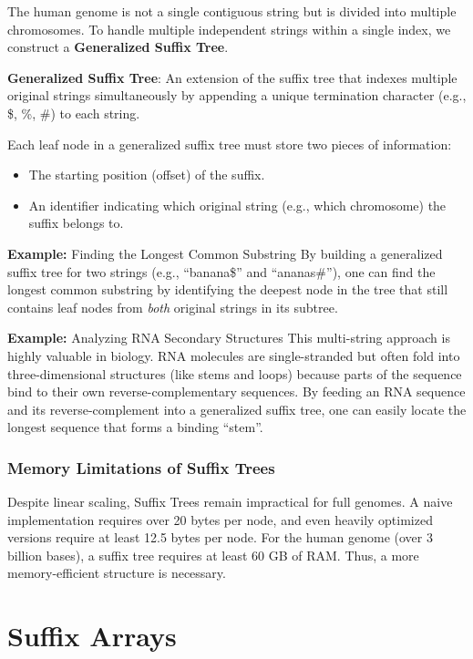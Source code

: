 The human genome is not a single contiguous string but is divided into multiple chromosomes. To handle multiple independent strings within a single index, we construct a \textbf{Generalized Suffix Tree}.

\begin{important}
  \textbf{Generalized Suffix Tree}: An extension of the suffix tree that indexes multiple original strings simultaneously by appending a unique termination character (e.g., \$, \%, \#) to each string.
\end{important}

Each leaf node in a generalized suffix tree must store two pieces of information:
\begin{itemize}
    \item The starting position (offset) of the suffix.
    \item An identifier indicating which original string (e.g., which chromosome) the suffix belongs to.
\end{itemize}

\textbf{Example:} Finding the Longest Common Substring
By building a generalized suffix tree for two strings (e.g., ``banana\$'' and ``ananas\#''), one can find the longest common substring by identifying the deepest node in the tree that still contains leaf nodes from \textit{both} original strings in its subtree. 

\textbf{Example:} Analyzing RNA Secondary Structures
This multi-string approach is highly valuable in biology. RNA molecules are single-stranded but often fold into three-dimensional structures (like stems and loops) because parts of the sequence bind to their own reverse-complementary sequences. By feeding an RNA sequence and its reverse-complement into a generalized suffix tree, one can easily locate the longest sequence that forms a binding ``stem''.

\subsubsection{Memory Limitations of Suffix Trees}
\sta Despite linear scaling, Suffix Trees remain impractical for full genomes. A naive implementation requires over 20 bytes per node, and even heavily optimized versions require at least 12.5 bytes per node. For the human genome (over 3 billion bases), a suffix tree requires at least 60 GB of RAM. Thus, a more memory-efficient structure is necessary.

\section{Suffix Arrays}

